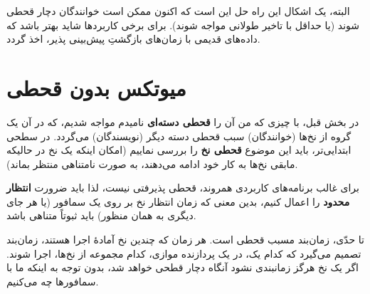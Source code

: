 \documentclass{book}
\newcommand{\clearemptydoublepage}{\newpage\cleardoublepage}
\begin{document}
    البته، یک اشکال این راه حل این است که اکنون ممکن است خوانندگان دچار قحطی شوند (یا حداقل با تاخیر طولانی مواجه شوند).  
    برای برخی کاربردها شاید بهتر باشد که داده‌های قدیمی با زمان‌های بازگشتِ پیش‌بینی‌ پذیر، اخذ گردد. 


\clearemptydoublepage
\section{میوتکس بدون قحطی}
\label{props}

    در بخش قبل، با چیزی که من آن را \textbf{قحطی دسته‌ای} نامیدم مواجه شدیم، که در آن یک گروه از نخ‌ها (خوانندگان) 
    سبب قحطی دسته دیگر (نویسندگان) می‌گردد. در  سطحی ابتدایی‌تر،‌ باید این موضوع \textbf{قحطی نخ} را بررسی نماییم (امکان 
    اینکه یک نخ در حالیکه مابقی نخ‌ها به کار خود ادامه می‌دهند، به صورت نامتناهی منتظر بماند). 
    
    
    برای غالب برنامه‌های کاربردی همروند، قحطی پذیرفتی نیست، لذا باید ضرورت \textbf{انتظار محدود}
    را اعمال کنیم، بدین معنی که زمان انتظار نخ بر روی یک سمافور (یا هر جای دیگری به همان منظور) باید ثبوتاً متناهی باشد. 

    تا حدّی، زمان‌بند مسبب قحطی است. هر زمان که چندین نخ آمادهٔ اجرا هستند، زمان‌بند تصمیم می‌گیرد که کدام یک، در یک پردازنده موازی،‌ کدام 
    مجموعه از نخ‌ها، اجرا شوند. اگر یک نخ هرگز زمانبندی نشود آنگاه دچار قطحی خواهد شد، بدون توجه به اینکه ما با سمافورها چه می‌کنیم. 
\end{document}
